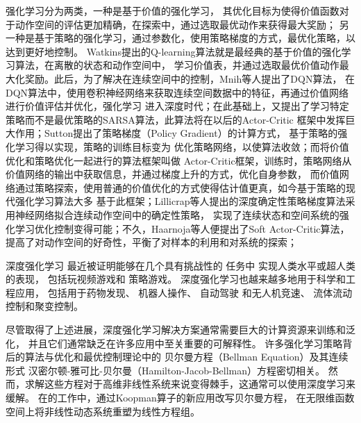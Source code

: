\documentclass[AutoFakeBold]{LZUThesis}
\begin{document}
强化学习分为两类，一种是基于价值的强化学习，
其优化目标为使得价值函数对于动作空间的评估更加精确，在探索中，通过选取最优动作来获得最大奖励；
另一种是基于策略的强化学习，通过参数化，使用策略梯度的方式，最优化策略，以达到更好地控制。
Watkins\cite{watkins_learning}提出的Q-learning算法就是最经典的基于价值的强化学习算法，在离散的状态和动作空间中，
学习价值表，并通过选取最优价值动作最大化奖励。此后，为了解决在连续空间中的控制，Mnih等人提出了DQN算法\cite{mnih_human-level_2015}，
在DQN算法中，使用卷积神经网络来获取连续空间数据中的特征，再通过价值网络进行价值评估并优化，强化学习
进入深度时代；在此基础上，又提出了学习特定策略而不是最优策略的SARSA算法，此算法将在以后的Actor-Critic
框架中发挥巨大作用；Sutton\cite{sutton_policy_1999}提出了策略梯度（Policy Gradient）的计算方式，
基于策略的强化学习得以实现，策略的训练目标变为
优化策略网络，以使算法收敛；而将价值优化和策略优化一起进行的算法框架叫做
Actor-Critic框架，训练时，策略网络从价值网络的输出中获取信息，并通过梯度上升的方式，优化自身参数，
而价值网络通过策略探索，使用普通的价值优化的方式使得估计值更真，如今基于策略的现代强化学习算法大多
基于此框架；Lillicrap等人\cite{lillicrap_continuous_2019}提出的深度确定性策略梯度算法采用神经网络拟合连续动作空间中的确定性策略，
实现了连续状态和空间系统的强化学习优化控制变得可能；不久，Haarnoja等人\cite{haarnoja_soft_2018}便提出了Soft Actor-Critic算法，
提高了对动作空间的好奇性，平衡了对样本的利用和对系统的探索；


深度强化学习 最近被证明能够在几个具有挑战性的
任务\cite{van_hasselt_deep_2016, sanghi_introduction_2021}中
实现人类水平或超人类的表现，
包括玩视频游戏\cite{mnih_human-level_2015, vinyals_grandmaster_2019}和
策略游戏\cite{silver_mastering_2016, silver_mastering_2017, silver_general_2018}。
深度强化学习也越来越多地用于科学和工程应用，
包括用于药物发现\cite{popova_deep_2018}、
机器人操作\cite{gu_deep_2017}、
自动驾驶\cite{sallab_deep_2017}
和无人机竞速\cite{kaufmann_champion-level_2023}、
流体流动控制\cite{gazzola_reinforcement_2014, colabrese_flow_2017, 
verma_efficient_2018, novati_controlled_2019, 
fan_reinforcement_2020}和聚变控制\cite{degrave_magnetic_2022}。

尽管取得了上述进展，深度强化学习解决方案通常需要巨大的计算资源来训练和泛化，
并且它们通常缺乏在许多应用中至关重要的可解释性。
许多强化学习策略背后的算法与优化和最优控制理论\cite{Brunton_book_2019}中的
贝尔曼方程（Bellman Equation）及其连续形式
汉密尔顿-雅可比-贝尔曼（Hamilton-Jacob-Bellman）方程密切相关。
然而，求解这些方程对于高维非线性系统来说变得棘手，这通常可以使用深度学习来缓解。
在\cite{karl}的工作中，通过Koopman算子的新应用改写贝尔曼方程，
在无限维函数空间上将非线性动态系统重塑为线性方程组。
\end{document}
